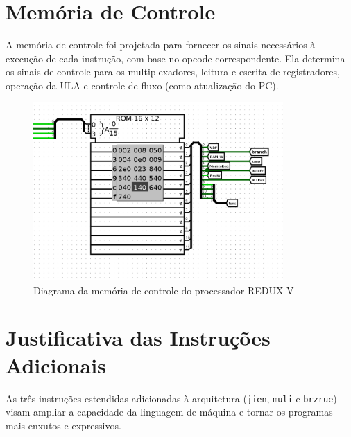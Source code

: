 \documentclass[12pt]{article}
\begin{document}
\section{Memória de Controle}

A memória de controle foi projetada para fornecer os sinais necessários à execução de cada instrução, com base no opcode correspondente. Ela determina os sinais de controle para os multiplexadores, leitura e escrita de registradores, operação da ULA e controle de fluxo (como atualização do PC).

\begin{figure}[H]
\centering
\includegraphics[width=0.85\textwidth]{images/controll_memory.png}
\caption{Diagrama da memória de controle do processador REDUX-V}
\label{fig:memoria_controle}
\end{figure}

\section{Justificativa das Instruções Adicionais}

As três instruções estendidas adicionadas à arquitetura (\texttt{jien}, \texttt{muli} e \texttt{brzrue}) visam ampliar a capacidade da linguagem de máquina e tornar os programas mais enxutos e expressivos.
\end{document}
